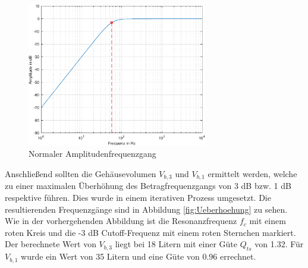 \begin{figure}[H]
    \centering
    \includegraphics[width=0.7\textwidth]{Figures/Normaler_Frequenzgang.eps}
    \caption{Normaler Amplitudenfrequenzgang}
    \label{fig:Normaler_Frequenzgang}
\end{figure}%

Anschließend sollten die Gehäusevolumen $V_{b,3}$ und $V_{b,1}$ ermittelt werden, welche zu einer maximalen Überhöhung des Betragfrequenzgangs von 3 dB bzw. 1 dB respektive führen.
Dies wurde in einem iterativen Prozess umgesetzt.
Die resultierenden Frequenzgänge sind in Abbildung \ref{fig:Ueberhoehung} zu sehen.
Wie in der vorhergehenden Abbildung ist die Resonanzfrequenz $f_c$ mit einem roten Kreis und die -3 dB Cutoff-Frequenz mit einem roten Sternchen markiert.
Der berechnete Wert von $V_{b,3}$ liegt bei 18 Litern mit einer Güte $Q_{ts}$ von 1.32.
Für $V_{b,1}$ wurde ein Wert von 35 Litern und eine Güte von 0.96 errechnet.

